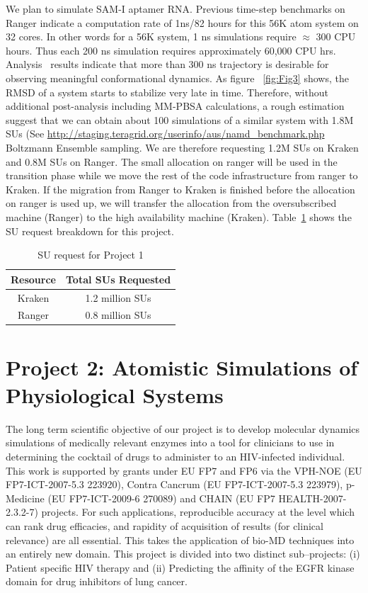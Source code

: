\documentclass[a4paper,10pt]{article}
\newcommand{\up}{\vspace*{-1em}}
\begin{document}
We plan to simulate SAM-I aptamer RNA. Previous time-step benchmarks on Ranger indicate a computation rate of 1ns/82 hours for this 56K atom system on 32 cores. In other words for a 56K system, 1 ns simulations require $\approx$ 300 CPU hours.  Thus each 200 ns simulation requires approximately 60,000 CPU hrs.  Analysis~\cite{SAM-I-NAR2009} results indicate that more than 300 ns trajectory is desirable for observing meaningful conformational dynamics. As figure ~\ref{fig:Fig3} shows, the RMSD of a system starts to stabilize very late in time. Therefore, without additional post-analysis including MM-PBSA calculations, a rough estimation suggest that we can obtain about 100 simulations of a similar system with 1.8M SUs (See {\url{http://staging.teragrid.org/userinfo/aus/namd_benchmark.php}} Boltzmann Ensemble sampling. We are therefore requesting 1.2M SUs on Kraken and 0.8M SUs on Ranger. The small allocation on ranger will be used in the transition phase while we move the rest of the code infrastructure from ranger to Kraken. If the migration from Ranger to Kraken is finished before the allocation on ranger is used up, we will transfer the allocation from the oversubscribed machine (Ranger) to the high availability machine (Kraken). Table~\ref{table:project1} shows the SU request
breakdown for this project.

\begin{table}[!h]
\begin{center}
\begin{tabular}{|c|c| }
\hline 
Resource & Total SUs Requested \\ 
\hline
Kraken   & 1.2 million SUs \\
\hline
Ranger   & 0.8 million SUs \\
\hline
\end{tabular}
\end{center}
  \caption{SU request for Project 1}\label{table:project1}
\up
\end{table}



\section{Project 2: Atomistic Simulations of Physiological Systems}

The long term scientific objective of our project is to develop molecular dynamics simulations of 
medically relevant enzymes into a tool for clinicians to use in determining the cocktail of drugs to 
administer to an HIV-infected individual. This work is supported by grants under EU FP7 and FP6 
via the VPH-NOE (EU FP7-ICT-2007-5.3 223920), Contra Cancrum (EU FP7-ICT-2007-5.3 223979), 
p-Medicine (EU FP7-ICT-2009-6 270089) and CHAIN (EU FP7 HEALTH-2007-2.3.2-7) projects. For such 
applications, reproducible accuracy at the level which can rank drug efficacies, and rapidity 
of acquisition of results (for clinical relevance) are all essential. This takes the application 
of bio-MD techniques into an entirely new domain. This project is divided into two distinct sub--projects:
(i) Patient specific HIV therapy and (ii) Predicting the affinity of the EGFR kinase domain for drug inhibitors of lung cancer.
\end{document}
